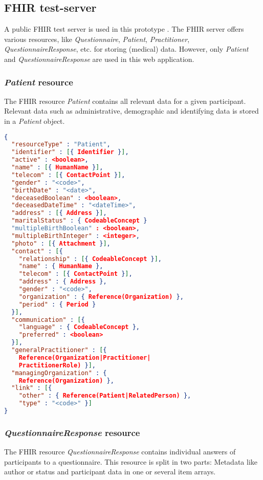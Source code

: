 \documentclass[
a4paper,
11pt
]{article}
\begin{document}
	
	\subsection*{FHIR test-server}
	A public \ac{FHIR} test server is used in this prototype \cite{noauthor_swagger_nodate}. The \ac{FHIR} server offers various resources, like \textit{Questionnaire}, \textit{Patient}, \textit{Practitioner}, \textit{QuestionnaireResponse}, etc. for storing (medical) data. However, only \textit{Patient} and \textit{QuestionnaireResponse} are used in this web application.
	
	\newpage
	
	\subsubsection*{\textit{Patient} resource}
	The \ac{FHIR} resource \textit{Patient} contains all relevant data for a given participant. Relevant data such as administrative, demographic and identifying data is stored in a \textit{Patient} object.\cite{noauthor_patient_nodate}
	
\begin{lstlisting}[language=json,firstnumber=1,caption={Patient.json},captionpos=b]
{
  "resourceType" : "Patient",
  "identifier" : [{ Identifier }],
  "active" : <boolean>,
  "name" : [{ HumanName }],
  "telecom" : [{ ContactPoint }],
  "gender" : "<code>",
  "birthDate" : "<date>",
  "deceasedBoolean" : <boolean>,
  "deceasedDateTime" : "<dateTime>",
  "address" : [{ Address }],
  "maritalStatus" : { CodeableConcept }
  "multipleBirthBoolean" : <boolean>,
  "multipleBirthInteger" : <integer>,
  "photo" : [{ Attachment }],
  "contact" : [{
    "relationship" : [{ CodeableConcept }],
    "name" : { HumanName },
    "telecom" : [{ ContactPoint }],
    "address" : { Address },
    "gender" : "<code>",
    "organization" : { Reference(Organization) },
    "period" : { Period }
  }],
  "communication" : [{
    "language" : { CodeableConcept },
    "preferred" : <boolean>
  }],
  "generalPractitioner" : [{
  	Reference(Organization|Practitioner|
    PractitionerRole) }],
  "managingOrganization" : {
  	Reference(Organization) },
  "link" : [{
    "other" : { Reference(Patient|RelatedPerson) },
    "type" : "<code>" }]
}
\end{lstlisting}

	\newpage
	
	\subsubsection*{\textit{QuestionnaireResponse} resource}
	The \ac{FHIR} resource \textit{QuestionnaireResponse} contains individual answers of participants to a questionnaire. This resource is split in two parts: Metadata like author or status and participant data in one or several item arrays.\cite{noauthor_questionnaireresponse_nodate}
	
\end{document}
